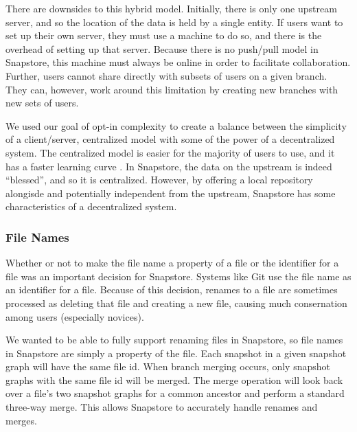 There are downsides to this hybrid model. Initially, there is only one upstream server, and so the location of the data is held by a single entity. If users want to set up their own server, they must use a machine to do so, and there is the overhead of setting up that server. Because there is no push/pull model in Snapstore, this machine must always be online in order to facilitate collaboration. Further, users cannot share directly with subsets of users on a given branch. They can, however, work around this limitation by creating new branches with new sets of users.

We used our goal of opt-in complexity to create a balance between the simplicity of a client/server, centralized model with some of the power of a decentralized system. The centralized model is easier for the majority of users to use, and it has a faster learning curve \cite{Brindescu}. In Snapstore, the data on the upstream is indeed ``blessed'', and so it is centralized. However, by offering a local repository alongisde and potentially independent from the upstream, Snapstore has some characteristics of a decentralized system.

\subsubsection{File Names}

Whether or not to make the file name a property of a file or the identifier for a file was an important decision for Snapstore. Systems like Git use the file name as an identifier for a file. Because of this decision, renames to a file are sometimes processed as deleting that file and creating a new file, causing much consernation among users (especially novices)\cite{RossoJackson}.

We wanted to be able to fully support renaming files in Snapstore, so file names in Snapstore are simply a property of the file. Each snapshot in a given snapshot graph will have the same file id. When branch merging occurs, only snapshot graphs with the same file id will be merged. The merge operation will look back over a file's two snapshot graphs for a common ancestor and perform a standard three-way merge. This allows Snapstore to accurately handle renames and merges.



